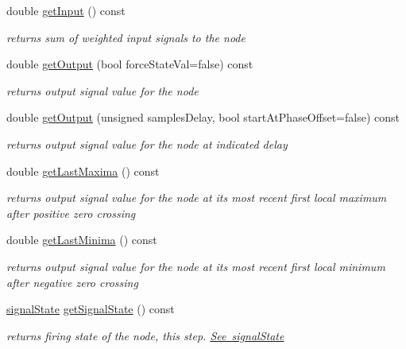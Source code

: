 \begin{DoxyCompactItemize}
double \mbox{\hyperlink{classMatsuNode_a15a4350b73d7466d8ff7565b19fd7cb5}{get\+Input}} () const
\begin{DoxyCompactList}\small\item\em returns sum of weighted input signals to the node \end{DoxyCompactList}\item 
double \mbox{\hyperlink{classMatsuNode_a7907676afb6f8d695c904ac1f8fc5798}{get\+Output}} (bool force\+State\+Val=false) const
\begin{DoxyCompactList}\small\item\em returns output signal value for the node \end{DoxyCompactList}\item 
double \mbox{\hyperlink{classMatsuNode_a049009ddb42ae27edf7e3e41a70799c7}{get\+Output}} (unsigned samples\+Delay, bool start\+At\+Phase\+Offset=false) const
\begin{DoxyCompactList}\small\item\em returns output signal value for the node at indicated delay \end{DoxyCompactList}\item 
double \mbox{\hyperlink{classMatsuNode_a5fa6c216b47aa2c433366093f48efe2a}{get\+Last\+Maxima}} () const
\begin{DoxyCompactList}\small\item\em returns output signal value for the node at its most recent first local maximum after positive zero crossing \end{DoxyCompactList}\item 
double \mbox{\hyperlink{classMatsuNode_acfa77ceec7938b33cada86bdf552d259}{get\+Last\+Minima}} () const
\begin{DoxyCompactList}\small\item\em returns output signal value for the node at its most recent first local minimum after negative zero crossing \end{DoxyCompactList}\item 
\mbox{\hyperlink{classMatsuNode_abd587a4a72c6774f689d21c78a8bc239}{signal\+State}} \mbox{\hyperlink{classMatsuNode_a43082483deea988ef12dfe8d945c3122}{get\+Signal\+State}} () const
\begin{DoxyCompactList}\small\item\em returns firing state of the node, this step. \mbox{\hyperlink{classMatsuNode_abd587a4a72c6774f689d21c78a8bc239}{See signal\+State}} \end{DoxyCompactList}\item 

\end{DoxyCompactItemize}
